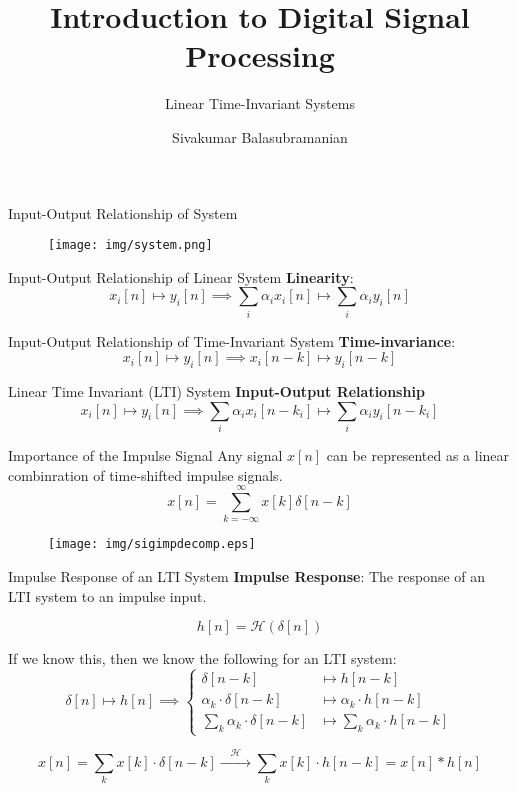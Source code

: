 \documentclass[aspectratio=169]{beamer}
\title{Introduction to Digital Signal Processing}
\subtitle{Linear Time-Invariant Systems}
\author{Sivakumar Balasubramanian}
\institute[Christian Medical College] %
{
  \inst{}%
  Department of Bioengineering\\
  Christian Medical College, Bagayam\\
  Vellore 632002
}
\date{}
\begin{document}
\begin{frame}
  \titlepage
\end{frame}

\begin{frame}[t]{Input-Output Relationship of System}
\begin{figure}
\texttt{[image: img/system.png]}
\end{figure}
\end{frame}

\begin{frame}[t]{Input-Output Relationship of Linear System}
\textbf{Linearity}:
\[ x_i[n] \mapsto y_i[n] \implies \sum_{i} \alpha_i x_i[n] \mapsto \sum_{i} \alpha_i y_i[n] \]
\end{frame}

\begin{frame}[t]{Input-Output Relationship of Time-Invariant System}
\textbf{Time-invariance}:  
\[ x_i[n] \mapsto y_i[n] \implies x_i[n - k] \mapsto y_i[n-k] \]
\end{frame}

\begin{frame}[t]{Linear Time Invariant (LTI) System}
\textbf{Input-Output Relationship}
\[ x_i[n] \mapsto y_i[n] \implies \sum_{i} \alpha_i x_i[n - k_i] \mapsto \sum_{i} \alpha_i y_i[n - k_i] \]
\end{frame}

\begin{frame}[t]{Importance of the Impulse Signal}
Any signal $x[n]$ can be represented as a linear combinration of time-shifted impulse signals.
\[ x[n]  = \sum_{k=-\infty}^{\infty} x[k] \delta[n - k] \]
\begin{figure}
\texttt{[image: img/sigimpdecomp.eps]}
\end{figure}
\end{frame}

\begin{frame}[t]{Impulse Response of an LTI System}
\textbf{Impulse Response}: The response of an LTI system to an impulse input.

\[ h[n]  = \mathcal{H}\left( \delta[n] \right) \]

If we know this, then we know the following for an LTI system:
\[ \delta[n] \mapsto h[n] \implies \begin{cases}
\delta[n - k] &\mapsto h[n - k] \\
\alpha_k \cdot \delta[n - k] &\mapsto \alpha_k \cdot h[n - k] \\
\sum_k \alpha_k \cdot \delta[n - k] &\mapsto \sum_k\alpha_k \cdot h[n - k]
\end{cases} \]

\[ x[n] =\sum_k x[k] \cdot \delta[n - k] \xrightarrow{\quad \mathcal{H} \quad} \sum_k x[k] \cdot h[n - k] = x[n] * h[n] \]
\end{frame}
\end{document}
